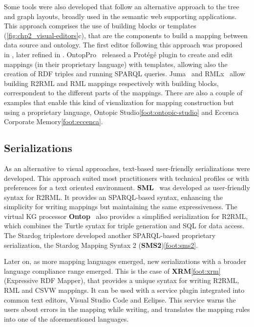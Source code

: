 
Some tools were also developed that follow an alternative approach to the tree and graph layouts, broadly used in the semantic web supporting applications. This approach comprises the use of building blocks or templates (\cref{fig:chp2_visual-editors}c), that are the components to build a mapping between data source and ontology. The first editor following this approach was proposed in \cite{sengupta2013editing}, later refined in \cite{pinkel2014best}. OntopPro~\parencite{calvanese2017ontop} released a Protégé plugin to create and edit mappings (in their proprietary language) with templates, allowing also the creation of RDF triples and running SPARQL queries. Juma~\parencite{junior2017juma} and RMLx~\parencite{aryan2017rmlx} allow building R2RML and RML mappings respectively with building blocks, correspondent to the different parts of the mappings. There are also a couple of examples that enable this kind of visualization for mapping construction but using a proprietary language, Ontopic Studio\cref{foot:ontopic-studio} and Eccenca Corporate Memory\cref{foot:eccenca}. 



\subsection{Serializations}
\label{sec:chp2_serializations}

As an alternative to visual approaches, text-based user-friendly serializations were developed. This approach suited most practitioners with technical profiles or with preferences for a text oriented environment. 
\textbf{SML}~\parencite{Stadler2015sml} was developed as user-friendly syntax for R2RML. It provides an SPARQL-based syntax, enhancing the simplicity for writing mappings but maintaining the same expressiveness. 
The virtual KG processor \textbf{Ontop}~\parencite{calvanese2017ontop} also provides a simplified serialization for R2RML, which combines the Turtle syntax for triple generation and SQL for data access. 
The Stardog triplestore developed another SPARQL-based proprietary serialization, the Stardog Mapping Syntax 2 (\textbf{SMS2})\cref{foot:sms2}. 

Later on, as more mapping languages emerged, new serializations with a broader language compliance range emerged. This is the case of \textbf{XRM}\cref{foot:xrm} (Expressive RDF Mapper), that provides a unique syntax for writing R2RML, RML and CSVW mappings. It can be used with a service plugin integrated into common text editors, Visual Studio Code and Eclipse. This service warns the users about errors in the mapping while writing, and translates the mapping rules into one of the aforementioned languages. 

